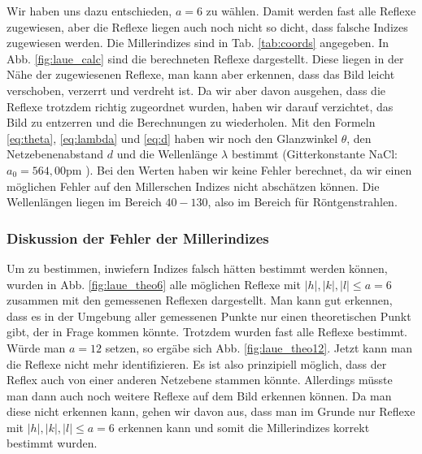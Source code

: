 Wir haben uns dazu entschieden, $a = 6$ zu wählen. Damit werden fast alle Reflexe zugewiesen, aber die Reflexe liegen auch noch nicht so dicht, dass falsche Indizes zugewiesen werden. Die Millerindizes sind in Tab. \ref{tab:coords} angegeben. In Abb. \ref{fig:laue_calc} sind die berechneten Reflexe dargestellt. Diese liegen in der Nähe der zugewiesenen Reflexe, man kann aber erkennen, dass das Bild leicht verschoben, verzerrt und verdreht ist. Da wir aber davon ausgehen, dass die Reflexe trotzdem richtig zugeordnet wurden, haben wir darauf verzichtet, das Bild zu entzerren und die Berechnungen zu wiederholen. Mit den Formeln \ref{eq:theta}, \ref{eq:lambda} und \ref{eq:d} haben wir noch den Glanzwinkel $\theta$, den Netzebenenabstand $d$ und die Wellenlänge $\lambda$ bestimmt (Gitterkonstante NaCl: $a_0 = 564,00 \si{\pico\meter}$ \cite{wiki_nacl}). Bei den Werten haben wir keine Fehler berechnet, da wir einen möglichen Fehler auf den Millerschen Indizes nicht abschätzen können. Die Wellenlängen liegen im Bereich $40 - 130$, also im Bereich für Röntgenstrahlen.

\subsubsection{Diskussion der Fehler der Millerindizes}
Um zu bestimmen, inwiefern Indizes falsch hätten bestimmt werden können, wurden in Abb. \ref{fig:laue_theo6} alle möglichen Reflexe mit $|h|,|k|,|l| \leq a = 6$ zusammen mit den gemessenen Reflexen dargestellt. Man kann gut erkennen, dass es in der Umgebung aller gemessenen Punkte nur einen theoretischen Punkt gibt, der in Frage kommen könnte. Trotzdem wurden fast alle Reflexe bestimmt. Würde man $a = 12$ setzen, so ergäbe sich Abb. \ref{fig:laue_theo12}. Jetzt kann man die Reflexe nicht mehr identifizieren. Es ist also prinzipiell möglich, dass der Reflex auch von einer anderen Netzebene stammen könnte. Allerdings müsste man dann auch noch weitere Reflexe auf dem Bild erkennen können. Da man diese nicht erkennen kann, gehen wir davon aus, dass man im Grunde nur Reflexe mit $|h|,|k|,|l| \leq a = 6$ erkennen kann und somit die Millerindizes korrekt bestimmt wurden.

